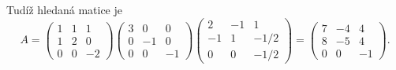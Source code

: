 \documentclass[10pt]{article}                   %
\begin{document}
\begin{priklad}[4.2]
\begin{reseni}
        Tudíž hledaná matice je
        $$ A = \begin{pmatrix} 1 & 1 & 1 \\ 1 & 2 & 0 \\ 0 & 0 & -2 \end{pmatrix} \begin{pmatrix} 3 & 0 & 0 \\ 0 & -1 & 0 \\ 0 & 0 & -1 \end{pmatrix} \begin{pmatrix}     2 & -1 & 1 \\ -1 & 1 & -1/2 \\ 0 & 0 & -1/2 \end{pmatrix} = \begin{pmatrix} 7 & -4 & 4 \\ 8 & -5 & 4 \\ 0 & 0 & -1 \end{pmatrix}. $$ 
    \end{reseni}
\end{priklad}
\end{document}

